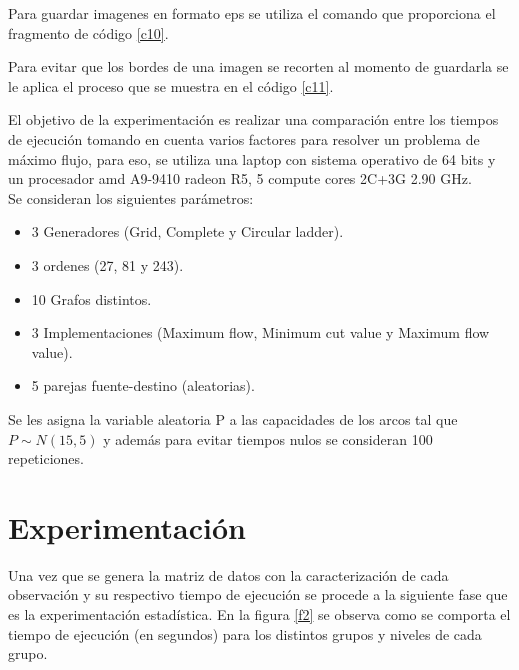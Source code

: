 \documentclass[12pt]{article}
\begin{document}
Para guardar imagenes en formato eps se utiliza el comando que proporciona el fragmento de código \ref{c10}.

\vspace{.3cm}
 \label{c10}
 
\vspace{.6cm}

Para evitar que los bordes de una imagen se recorten al momento de guardarla se le aplica el proceso que se muestra en el código \ref{c11}.
\vspace{.3cm}
 \label{c11}


\vspace{.4cm}
El objetivo de la experimentación es realizar una comparación entre los tiempos de ejecución tomando en cuenta varios factores para resolver un problema de máximo flujo, para eso, se utiliza una laptop con sistema operativo de 64 bits y un procesador amd A9-9410 radeon R5, 5 compute cores 2C+3G 2.90 GHz. \\

Se consideran los siguientes parámetros:
\begin{itemize}
\item 3 Generadores (Grid, Complete y Circular ladder).
\item 3 ordenes  (27, 81 y 243).
\item 10 Grafos distintos.
\item 3 Implementaciones (Maximum flow, Minimum cut value y Maximum flow value).
\item 5 parejas fuente-destino (aleatorias).
\end{itemize}

Se les asigna la variable aleatoria P a las capacidades de los arcos tal que $P\sim N(15,5)$ y además para evitar tiempos nulos se consideran 100 repeticiones.

\newpage
\section{Experimentación}

Una vez que se genera la matriz de datos con la caracterización de cada observación y su respectivo tiempo de ejecución se procede a la siguiente fase que es la experimentación estadística. En la figura \ref{f2} se observa como se comporta el tiempo de ejecución (en segundos) para los distintos grupos y niveles de cada grupo.  
\end{document}
